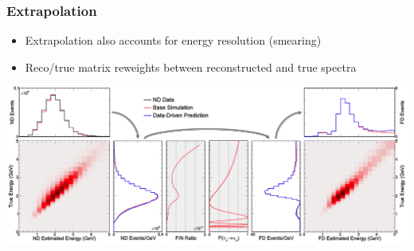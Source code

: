 \documentclass[10pt,professionalfonts,xcolor=table]{beamer}
\begin{document}
\begin{frame}
\frametitle{Extrapolation}

  \begin{itemize}
  \item Extrapolation also accounts for energy resolution (smearing)
  \item Reco/true matrix reweights between reconstructed and true spectra

  \end{itemize}
  \gap
  \begin{center}
   \includegraphics[width=\textwidth]{figures/figures/extrap_schematic.png}
  \end{center}
\end{frame}
\end{document}
